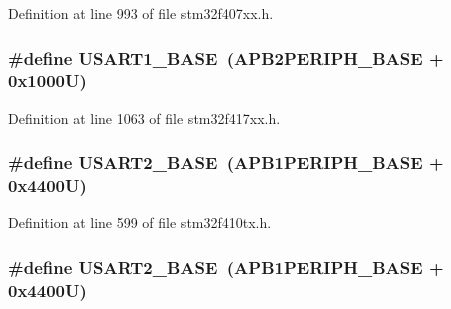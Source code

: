 Definition at line 993 of file stm32f407xx.\+h.

\subsubsection[{\texorpdfstring{U\+S\+A\+R\+T1\+\_\+\+B\+A\+SE}{USART1_BASE}}]{\setlength{\rightskip}{0pt plus 5cm}\#define U\+S\+A\+R\+T1\+\_\+\+B\+A\+SE~({\bf A\+P\+B2\+P\+E\+R\+I\+P\+H\+\_\+\+B\+A\+SE} + 0x1000\+U)}\hypertarget{group___peripheral__registers__structures_ga86162ab3f740db9026c1320d46938b4d}{}\label{group___peripheral__registers__structures_ga86162ab3f740db9026c1320d46938b4d}


Definition at line 1063 of file stm32f417xx.\+h.

\subsubsection[{\texorpdfstring{U\+S\+A\+R\+T2\+\_\+\+B\+A\+SE}{USART2_BASE}}]{\setlength{\rightskip}{0pt plus 5cm}\#define U\+S\+A\+R\+T2\+\_\+\+B\+A\+SE~({\bf A\+P\+B1\+P\+E\+R\+I\+P\+H\+\_\+\+B\+A\+SE} + 0x4400\+U)}\hypertarget{group___peripheral__registers__structures_gade83162a04bca0b15b39018a8e8ec090}{}\label{group___peripheral__registers__structures_gade83162a04bca0b15b39018a8e8ec090}


Definition at line 599 of file stm32f410tx.\+h.

\subsubsection[{\texorpdfstring{U\+S\+A\+R\+T2\+\_\+\+B\+A\+SE}{USART2_BASE}}]{\setlength{\rightskip}{0pt plus 5cm}\#define U\+S\+A\+R\+T2\+\_\+\+B\+A\+SE~({\bf A\+P\+B1\+P\+E\+R\+I\+P\+H\+\_\+\+B\+A\+SE} + 0x4400\+U)}\hypertarget{group___peripheral__registers__structures_gade83162a04bca0b15b39018a8e8ec090}{}\label{group___peripheral__registers__structures_gade83162a04bca0b15b39018a8e8ec090}


